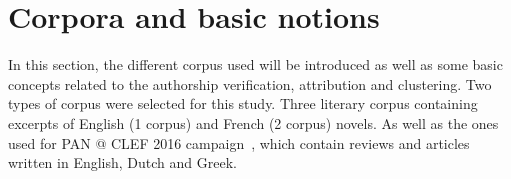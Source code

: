 \section{Corpora and basic notions \label{sec:corpora_and_basic_notions}}

In this section, the different corpus used will be introduced as well as some basic concepts related to the authorship verification, attribution and clustering.
Two types of corpus were selected for this study.
Three literary corpus containing excerpts of English (1 corpus) and French (2 corpus) novels.
As well as the ones used for PAN @ CLEF 2016 campaign~\cite{pan16}, which contain reviews and articles written in English, Dutch and Greek.




